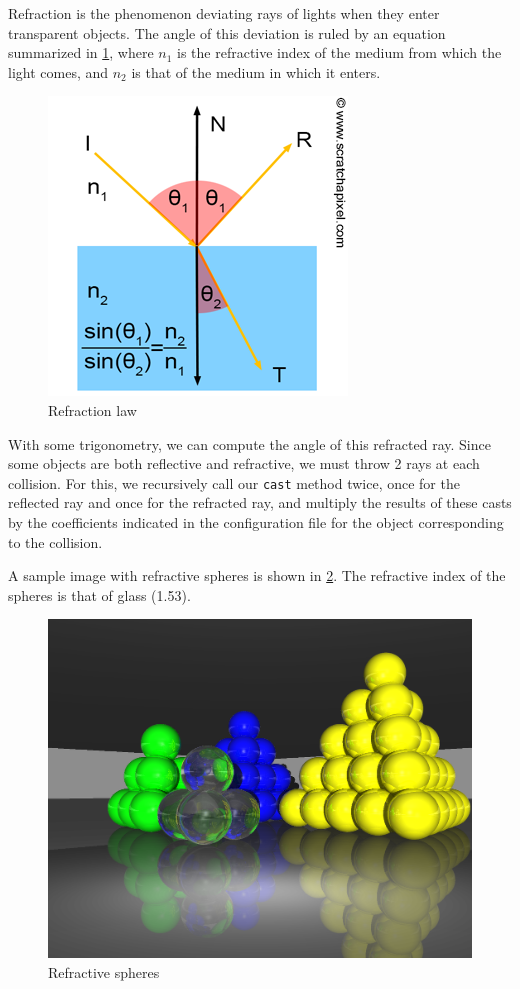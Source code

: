 \documentclass[a4paper,12pt,journal,twoside,compsoc]{PPIEEEtran}
\begin{document}
Refraction is the phenomenon deviating rays of lights when they enter
transparent objects.  The angle of this deviation is ruled by an equation
summarized in \cref{fig:refr}, where $n_1$ is the refractive index of the medium
from which the light comes, and $n_2$ is that of the medium in which it enters.
\begin{figure}
  \begin{center}
    \includegraphics[width=0.7\linewidth]{refraction.png}
  \end{center}
  \caption{Refraction law}
  \label{fig:refr}
\end{figure}

With some trigonometry, we can compute the angle of this refracted ray.  Since
some objects are both reflective and refractive, we must throw 2 rays at each
collision.  For this, we recursively call our \texttt{cast} method twice, once
for the reflected ray and once for the refracted ray, and multiply the results
of these casts by the coefficients indicated in the configuration file for the
object corresponding to the collision.

A sample image with refractive spheres is shown in \cref{fig:sample-refr}.  The
refractive index of the spheres is that of glass (1.53).

\begin{figure}
  \begin{center}
    \includegraphics[width=0.7\linewidth]{sample-refraction.png}
  \end{center}
  \caption{Refractive spheres}
  \label{fig:sample-refr}
\end{figure}
\end{document}
